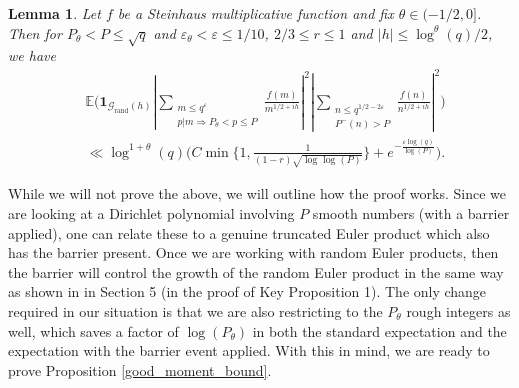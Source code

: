 \documentclass[10pt,a4paper]{amsart}
\newtheorem{lemma}{Lemma}
\numberwithin{equation}{section}
\begin{document}
\begin{lemma}
    Let $f$ be a Steinhaus multiplicative function and fix $\theta \in (-1/2,0]$. Then for $P_\theta < P \leq \sqrt{q}$ and $\varepsilon_\theta < \varepsilon \leq 1/10$, $2/3 \leq r \leq 1$ and $|h| \leq \log^\theta(q)/2$, we have
    \begin{align*}
        &\mathbb{E}\big(\mathbf{1}_{\mathcal{G}_{\text{rand}}(h)}|\sum_{\substack{m \leq q^\varepsilon \\ p|m \Rightarrow P_\theta < p \leq P}}\frac{f(m)}{m^{1/2+ih}}|^2|\sum_{\substack{n \leq q^{1/2-2\varepsilon} \\ P^-(n) > P}}\frac{f(n)}{n^{1/2+ih}}|^2\big) \\ &\ll \log^{1+\theta}(q)\big(C\min\big\{1,\frac{1}{(1-r)\sqrt{\log\log(P)}}\big\}+e^{-\frac{\varepsilon\log(q)}{\log(P)}}\big).
    \end{align*} \label{log_cor_barrier_moment}
\end{lemma}
While we will not prove the above, we will outline how the proof works. Since we are looking at a Dirichlet polynomial involving $P$ smooth numbers (with a barrier applied), one can relate these to a genuine truncated Euler product which also has the barrier present. Once we are working with random Euler products, then the barrier will control the growth of the random Euler product in the same way as shown in \cite{aharper201} in Section 5 (in the proof of Key Proposition 1). The only change required in our situation is that we are also restricting to the $P_\theta$ rough integers as well, which saves a factor of $\log(P_\theta)$ in both the standard expectation and the expectation with the barrier event applied. With this in mind, we are ready to prove Proposition \ref{good_moment_bound}.
\end{document}

